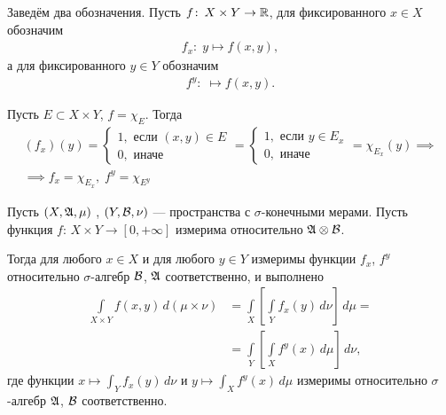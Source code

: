 
\begin{df}
 Заведём два обозначения. Пусть $f \colon\, X \times Y \to \mathbb{R} $, для фиксированного $x \in X$ обозначим \begin{align*}
  f_x \colon\; y \mapsto f(x, y)
 ,\end{align*} а для фиксированного $y \in Y$ обозначим \begin{align*}
  f^{y} \colon\; \mapsto f(x, y)
 .\end{align*} 
\end{df}
\begin{remrk}
 Пусть $E \subset X \times Y$, $f = \chi_E$. Тогда \begin{align*}
  (f_x)(y) = \begin{cases}
   1, \text{ если } (x, y) \in E \\
   0, \text{ иначе }
  \end{cases} = \begin{cases}
   1, \text{ если } y \in E_x \\
   0, \text{ иначе }
  \end{cases} = \chi_{E_x}(y) \implies \\
  \implies f_x = \chi_{E_x}, \; f^{y} = \chi_{E^{y}}
 \end{align*} 
\end{remrk}
\begin{thm}[%
Тонелли]
\label{theorem:tonelli}

Пусть $(X, \mathfrak{A}, \mu)$ , $(Y, \mathcal{B}, \nu)$  --- пространства с $\sigma$-конечными мерами. Пусть функция $f \colon\, X \times Y \to [0, +\infty] $  измерима относительно $\mathfrak{A} \otimes \mathcal{B}$.

Тогда для любого $x \in X$ и для любого $y \in Y$ измеримы функции $f_x$, $f^{y}$ относительно $\sigma$-алгебр $\mathcal{B}$, $\mathfrak{A}$ соответственно, и выполнено \begin{align}
 \label{equation1:theorem:tonelli}
 \int\limits_{X \times Y} f(x,y) \, d(\mu \times \nu) &= \int\limits_{X}   \left[ \int\limits_{Y} f_x(y) \, d\nu   \right] \, d\mu = \\
 \label{equation2:theorem:tonelli}
 &= \int\limits_{Y} \left[ \int\limits_{X} f^{y}(x) \, d\mu   \right] \, d\nu  
,\end{align} где функции $x \mapsto \int_{Y} f_x(y) \, d\nu  $ и $y \mapsto \int_{X} f^{y}(x) \, d\mu  $ измеримы относительно $\sigma$-алгебр $\mathfrak{A}$, $\mathcal{B}$ соответственно.
\end{thm}
